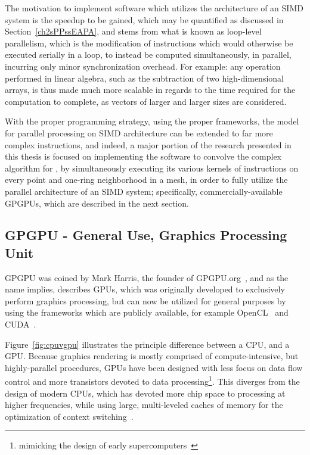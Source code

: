 The motivation to implement software which utilizes the architecture of an \gls{SIMD} system is the speedup to be gained, which may be quantified as discussed in Section~\ref{ch2sPPssEAPA}, and stems from what is known as loop-level parallelism, which is the modification of instructions which would otherwise be executed serially in a loop, to instead be computed simultaneously, in parallel, incurring only minor synchronization overhead. For example: any operation performed in linear algebra, such as the subtraction of two high-dimensional arrays, is thus made much more scalable in regards to the time required for the computation to complete, as vectors of larger and larger sizes are considered.

With the proper programming strategy, using the proper frameworks, the model for parallel processing on \gls{SIMD} architecture can be extended to far more complex instructions, and indeed, a major portion of the research presented in this thesis is focused on implementing the software to convolve the complex algorithm for , by simultaneously executing its various kernels of instructions on every point and one-ring neighborhood in a mesh, in order to fully utilize the parallel architecture of an SIMD system; specifically, commercially-available \glspl{GPGPU}, which are described in the next section.

%
%
%
%
\subsection{GPGPU - General Use, Graphics Processing Unit}
\label{ch2sPPssGPGPU}
\gls{GPGPU} was coined by Mark Harris, the founder of GPGPU.org~\cite{GPGPU19}, and as the name implies, describes \glspl{GPU}, which was originally developed to exclusively perform graphics processing, but can now be utilized for general purposes by using the frameworks which are publicly available, for example OpenCL~\cite{Khronos19} and CUDA~\cite{CUDA19}.

Figure~\ref{fig:cpuvgpu} illustrates the principle difference between a \gls{CPU}, and a GPU. Because graphics rendering is mostly comprised of compute-intensive, but highly-parallel procedures, \glspl{GPU} have been designed with less focus on data flow control and more transistors devoted to data processing\footnote{mimicking the design of early supercomputers~\cite[p.7-9]{Lang17}}. This diverges from the design of modern CPUs, which has devoted more chip space to processing at higher frequencies, while using large, multi-leveled caches of memory for the optimization of context switching~\cite{Silberschatz10}.

